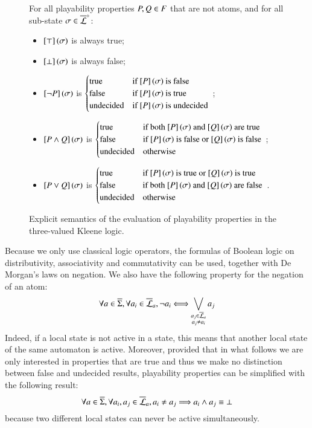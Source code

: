 \begin{figure}[ht]
  For all playability properties $P, Q \in F$ that are not atoms,
  and for all sub-state $\sigma \in \overline{\mathcal{L}}^{\diamond}$:
  \begin{itemize}
    \item $\left[\top\right](\sigma)$ is always true;
    \item $\left[\bot\right](\sigma)$ is always false;
    \item $\left[\neg P\right](\sigma)$ is
      $\begin{cases}
        \text{true} & \text{if $\left[P\right](\sigma)$ is false} \\
        \text{false} & \text{if $\left[P\right](\sigma)$ is true} \\
        \text{undecided} & \text{if $\left[P\right](\sigma)$ is undecided}
      \end{cases}$ \enspace;
    \item $\left[P \wedge Q\right](\sigma)$ is
      $\begin{cases}
        \text{true} & \text{if both $\left[P\right](\sigma)$ and $\left[Q\right](\sigma)$ are true} \\
        \text{false} & \text{if $\left[P\right](\sigma)$ is false or $\left[Q\right](\sigma)$ is false} \\
        \text{undecided} & \text{otherwise}
      \end{cases}$ \enspace;
    \item $\left[P \vee Q\right](\sigma)$ is
      $\begin{cases}
        \text{true} & \text{if $\left[P\right](\sigma)$ is true or $\left[Q\right](\sigma)$ is true} \\
        \text{false} & \text{if both $\left[P\right](\sigma)$ and $\left[Q\right](\sigma)$ are false} \\
        \text{undecided} & \text{otherwise}
      \end{cases}$ \enspace.
  \end{itemize}
  \caption{\label{fig:kleene}%
    Explicit semantics of the evaluation of playability properties in the
    three-valued Kleene logic.
  }
\end{figure}



Because we only use classical logic operators, the formulas of Boolean logic on
distributivity, associativity and commutativity can be used, together with De Morgan's laws on negation.
We also have the following property for the negation of an atom:
\[\forall a \in \overline{\Sigma}, \forall a_i \in \overline{\mathcal{L}}_a,
  \neg a_i \Longleftrightarrow \bigvee_{\substack{a_j \in \overline{\mathcal{L}}_a\\a_j \neq a_i}} a_j\]
Indeed, if a local state is not active in a state, this means that another local state of the same automaton is active.
Moreover,
provided that in what follows we are only interested in properties that are true
and thus we make no distinction between false and undecided results,
playability properties can be simplified with the following result:
\[\forall a \in \overline{\Sigma}, \forall a_i, a_j \in \overline{\mathcal{L}}_a,
  a_i \neq a_j \Longrightarrow a_i \wedge a_j \equiv \bot \]
because two different local states can never be active simultaneously.

